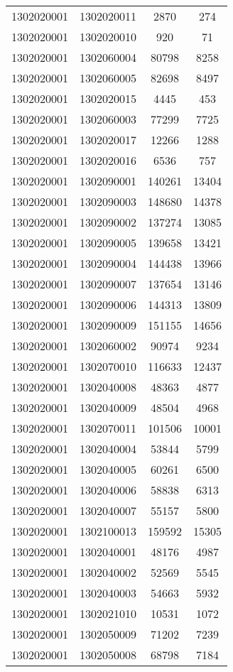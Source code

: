 \begin{longtable}[h]{llcc}
		1302020001 & 1302020011 & 2870 & 274\\
		1302020001 & 1302020010 & 920 & 71\\
		1302020001 & 1302060004 & 80798 & 8258\\
		1302020001 & 1302060005 & 82698 & 8497\\
		1302020001 & 1302020015 & 4445 & 453\\
		1302020001 & 1302060003 & 77299 & 7725\\
		1302020001 & 1302020017 & 12266 & 1288\\
		1302020001 & 1302020016 & 6536 & 757\\
		1302020001 & 1302090001 & 140261 & 13404\\
		1302020001 & 1302090003 & 148680 & 14378\\
		1302020001 & 1302090002 & 137274 & 13085\\
		1302020001 & 1302090005 & 139658 & 13421\\
		1302020001 & 1302090004 & 144438 & 13966\\
		1302020001 & 1302090007 & 137654 & 13146\\
		1302020001 & 1302090006 & 144313 & 13809\\
		1302020001 & 1302090009 & 151155 & 14656\\
		1302020001 & 1302060002 & 90974 & 9234\\
		1302020001 & 1302070010 & 116633 & 12437\\
		1302020001 & 1302040008 & 48363 & 4877\\
		1302020001 & 1302040009 & 48504 & 4968\\
		1302020001 & 1302070011 & 101506 & 10001\\
		1302020001 & 1302040004 & 53844 & 5799\\
		1302020001 & 1302040005 & 60261 & 6500\\
		1302020001 & 1302040006 & 58838 & 6313\\
		1302020001 & 1302040007 & 55157 & 5800\\
		1302020001 & 1302100013 & 159592 & 15305\\
		1302020001 & 1302040001 & 48176 & 4987\\
		1302020001 & 1302040002 & 52569 & 5545\\
		1302020001 & 1302040003 & 54663 & 5932\\
		1302020001 & 1302021010 & 10531 & 1072\\
		1302020001 & 1302050009 & 71202 & 7239\\
		1302020001 & 1302050008 & 68798 & 7184\\

\end{longtable}
